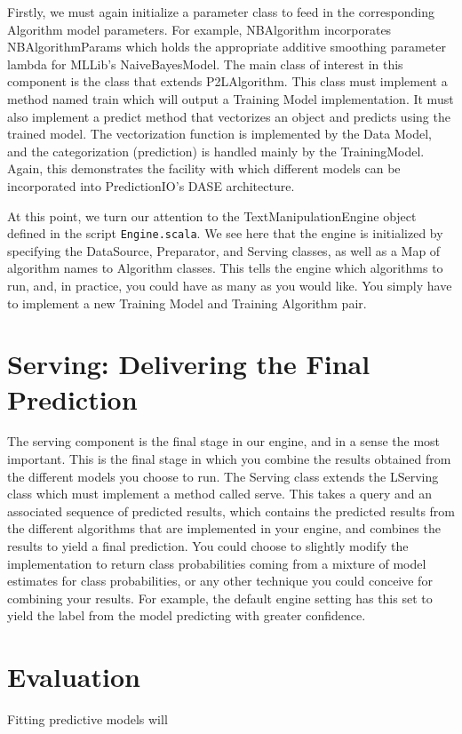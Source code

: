 \documentclass[a4paper,12pt]{article}
\renewcommand{\tt}[1]{\texttt{#1}}
\newcommand{\3}{\left}
\newcommand{\4}{\right}
\renewcommand{\-}[1]{{}^{-#1}}
\begin{document}
Firstly, we must again initialize a parameter class to feed in the corresponding Algorithm model parameters. For example, NBAlgorithm incorporates NBAlgorithmParams which holds the appropriate additive smoothing parameter lambda for MLLib's NaiveBayesModel. The main class of interest in this component is the class that extends P2LAlgorithm.
 This class must implement a method named train which will output a Training Model implementation. It must also implement a predict method that vectorizes an object and predicts using the trained model. The vectorization function is implemented by the Data Model, and the categorization (prediction) is handled mainly by the TrainingModel. Again, this demonstrates the facility with which different models can be incorporated into PredictionIO's DASE architecture.
 
At this point, we turn our attention to the TextManipulationEngine object defined in the script \tt{Engine.scala}. We see here that the engine is initialized by specifying the DataSource, Preparator, and Serving classes, as well as a Map of algorithm names to Algorithm classes. This tells the engine which algorithms to run, and, in practice, you could have as many as you would like. You simply have to implement a new Training Model and Training Algorithm pair. 

\section*{Serving: Delivering the Final Prediction}

The serving component is the final stage in our engine, and in a sense the most important. This is the final stage in which you combine the results obtained from the different models you choose to run. The Serving class extends the LServing
 class which must implement a method called serve. This takes a query and an associated sequence of predicted results, which contains the predicted results from the different algorithms that are implemented in your engine, and combines the results to yield a final prediction.  You could choose to slightly modify the implementation to return class probabilities coming from a mixture of model estimates for class probabilities, or any other technique you could conceive for combining your results. For example, the default engine setting has this set to yield the label from the model predicting with greater confidence.
 
 
 
 \section*{Evaluation}
 
 Fitting predictive models will 
\end{document}
